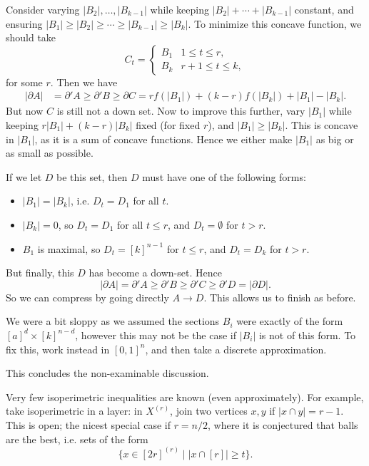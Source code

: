 \documentclass[12pt]{article}
\begin{document}
\begin{proofbox}
	Consider varying $|B_2|, \ldots, |B_{k-1}|$ while keeping $|B_2| + \cdots + |B_{k-1}|$ constant, and ensuring $|B_1| \geq |B_2| \geq \cdots \geq |B_{k-1}| \geq |B_k|$. To minimize this concave function, we should take
	\[
	C_t = 
	\begin{cases}
		B_1 & 1 \leq t \leq r, \\
		B_k & r+1 \leq t \leq k,
	\end{cases}
	\]
	for some $r$. Then we have
	\begin{align*}
		|\partial A| &= \partial' A \geq \partial' B \geq \partial C = r f(|B_1|) + (k - r) f(|B_k|) + |B_1| - |B_k|.
	\end{align*}
	But now $C$ is still not a down set. Now to improve this further, vary $|B_1|$ while keeping $r |B_1| + (k - r) |B_k|$ fixed (for fixed $r$), and $|B_1| \geq |B_k|$. This is concave in $|B_1|$, as it is a sum of concave functions. Hence we either make $|B_1|$ as big or as small as possible.

	If we let $D$ be this set, then $D$ must have one of the following forms:
	\begin{itemize}
		\item $|B_1| = |B_k|$, i.e. $D_t = D_1$ for all $t$.
		\item $|B_k| = 0$, so $D_t = D_1$ for all $t \leq r$, and $D_t = \emptyset$ for $t > r$.
		\item $B_1$ is maximal, so $D_t = [k]^{n-1}$ for $t \leq r$, and $D_t = D_k$ for $t > r$.
	\end{itemize}
	But finally, this $D$ has become a down-set. Hence
	\[
	|\partial A| = \partial' A \geq \partial' B \geq \partial' C \geq \partial' D = |\partial D|.
	\]
	So we can compress by going directly $A \to D$. This allows us to finish as before.
\end{proofbox}

\begin{remark}
	We were a bit sloppy as we assumed the sections $B_i$ were exactly of the form $[a]^{d} \times [k]^{n-d}$, however this may not be the case if $|B_i|$ is not of this form. To fix this, work instead in $[0, 1]^{n}$, and then take a discrete approximation.
\end{remark}

This concludes the non-examinable discussion.


\begin{remark}
	Very few isoperimetric inequalities are known (even approximately). For example, take isoperimetric in a layer: in $X^{(r)}$, join two vertices $x, y$ if $|x \cap y| = r - 1$. This is open; the nicest special case if $r = n/2$, where it is conjectured that balls are the best, i.e. sets of the form
	\[
		\{x \in [2r]^{(r)} \mid |x \cap [r]| \geq t\}.
	\]
\end{remark}
\end{document}
